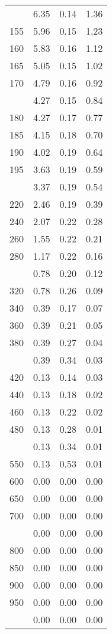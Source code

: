\begin{table}[ht]
\begin{tabular}{lccc}
   \addlinespace
150 & 6.35 & 0.14 & 1.36 \\ 
  155 & 5.96 & 0.15 & 1.23 \\ 
  160 & 5.83 & 0.16 & 1.12 \\ 
  165 & 5.05 & 0.15 & 1.02 \\ 
  170 & 4.79 & 0.16 & 0.92 \\ 
   \addlinespace
175 & 4.27 & 0.15 & 0.84 \\ 
  180 & 4.27 & 0.17 & 0.77 \\ 
  185 & 4.15 & 0.18 & 0.70 \\ 
  190 & 4.02 & 0.19 & 0.64 \\ 
  195 & 3.63 & 0.19 & 0.59 \\ 
   \addlinespace
200 & 3.37 & 0.19 & 0.54 \\ 
  220 & 2.46 & 0.19 & 0.39 \\ 
  240 & 2.07 & 0.22 & 0.28 \\ 
  260 & 1.55 & 0.22 & 0.21 \\ 
  280 & 1.17 & 0.22 & 0.16 \\ 
   \addlinespace
300 & 0.78 & 0.20 & 0.12 \\ 
  320 & 0.78 & 0.26 & 0.09 \\ 
  340 & 0.39 & 0.17 & 0.07 \\ 
  360 & 0.39 & 0.21 & 0.05 \\ 
  380 & 0.39 & 0.27 & 0.04 \\ 
   \addlinespace
400 & 0.39 & 0.34 & 0.03 \\ 
  420 & 0.13 & 0.14 & 0.03 \\ 
  440 & 0.13 & 0.18 & 0.02 \\ 
  460 & 0.13 & 0.22 & 0.02 \\ 
  480 & 0.13 & 0.28 & 0.01 \\ 
   \addlinespace
500 & 0.13 & 0.34 & 0.01 \\ 
  550 & 0.13 & 0.53 & 0.01 \\ 
  600 & 0.00 & 0.00 & 0.00 \\ 
  650 & 0.00 & 0.00 & 0.00 \\ 
  700 & 0.00 & 0.00 & 0.00 \\ 
   \addlinespace
750 & 0.00 & 0.00 & 0.00 \\ 
  800 & 0.00 & 0.00 & 0.00 \\ 
  850 & 0.00 & 0.00 & 0.00 \\ 
  900 & 0.00 & 0.00 & 0.00 \\ 
  950 & 0.00 & 0.00 & 0.00 \\ 
   \addlinespace
1000 & 0.00 & 0.00 & 0.00 \\ 
   \bottomrule
\end{tabular}
\end{table}
